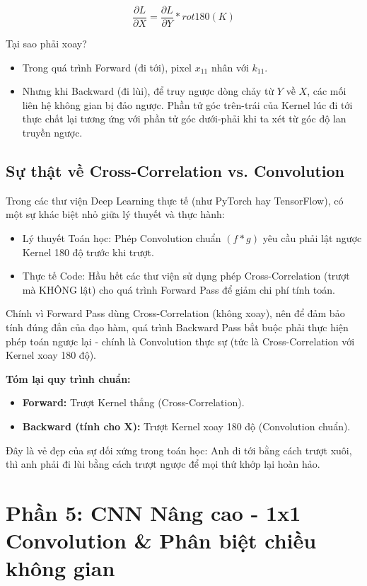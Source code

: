 \documentclass[11pt]{article}
\begin{document}
$$ \frac{\partial L}{\partial X} = \frac{\partial L}{\partial Y} * rot180(K) $$

Tại sao phải xoay?
\begin{itemize}
    \item Trong quá trình Forward (đi tới), pixel $x_{11}$ nhân với $k_{11}$.
    \item Nhưng khi Backward (đi lùi), để truy ngược dòng chảy từ $Y$ về $X$, các mối liên hệ không gian bị đảo ngược. Phần tử góc trên-trái của Kernel lúc đi tới thực chất lại tương ứng với phần tử góc dưới-phải khi ta xét từ góc độ lan truyền ngược.
\end{itemize}

\subsection{Sự thật về Cross-Correlation vs. Convolution}
Trong các thư viện Deep Learning thực tế (như PyTorch hay TensorFlow), có một sự khác biệt nhỏ giữa lý thuyết và thực hành:
\begin{itemize}
    \item Lý thuyết Toán học: Phép Convolution chuẩn $(f * g)$ yêu cầu phải lật ngược Kernel 180 độ trước khi trượt.
    \item Thực tế Code: Hầu hết các thư viện sử dụng phép Cross-Correlation (trượt mà KHÔNG lật) cho quá trình Forward Pass để giảm chi phí tính toán.
\end{itemize}

Chính vì Forward Pass dùng Cross-Correlation (không xoay), nên để đảm bảo tính đúng đắn của đạo hàm, quá trình Backward Pass bắt buộc phải thực hiện phép toán ngược lại - chính là Convolution thực sự (tức là Cross-Correlation với Kernel xoay 180 độ).

\begin{summarybox}
\textbf{Tóm lại quy trình chuẩn:}
\begin{itemize}
    \item \textbf{Forward:} Trượt Kernel thẳng (Cross-Correlation).
    \item \textbf{Backward (tính cho X):} Trượt Kernel xoay 180 độ (Convolution chuẩn).
\end{itemize}
Đây là vẻ đẹp của sự đối xứng trong toán học: Anh đi tới bằng cách trượt xuôi, thì anh phải đi lùi bằng cách trượt ngược để mọi thứ khớp lại hoàn hảo.
\end{summarybox}


\section{Phần 5: CNN Nâng cao - 1x1 Convolution \& Phân biệt chiều không gian}
\end{document}
